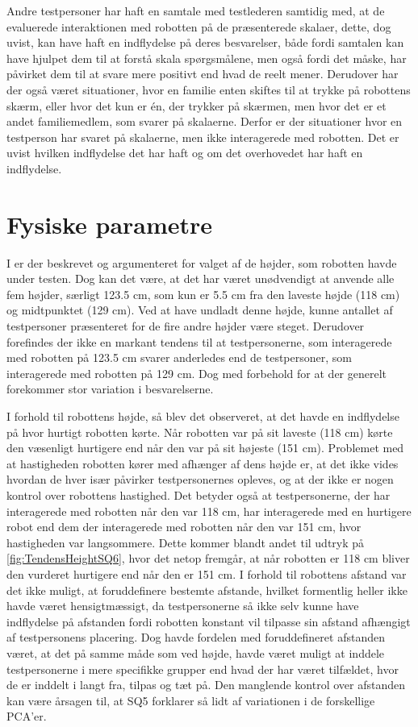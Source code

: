 Andre testpersoner har haft en samtale med testlederen samtidig med, at de evaluerede interaktionen med robotten på de præsenterede skalaer, dette, dog uvist, kan have haft en indflydelse på deres besvarelser, både fordi samtalen kan have hjulpet dem til at forstå skala spørgsmålene, men også fordi det måske, har påvirket dem til at svare mere positivt end hvad de reelt mener. Derudover har der også været situationer, hvor en familie enten skiftes til at trykke på robottens skærm, eller hvor det kun er én, der trykker på skærmen, men hvor det er et andet familiemedlem, som svarer på skalaerne. Derfor er der situationer hvor en testperson har svaret på skalaerne, men ikke interagerede med robotten. Det er uvist hvilken indflydelse det har haft og om det overhovedet har haft en indflydelse.  


\section{Fysiske parametre}
\label{DiskussionFysiskeParametre}
%
I  er der beskrevet og argumenteret for valget af de højder, som robotten havde under testen. Dog kan det være, at det har været unødvendigt at anvende alle fem højder, særligt 123.5 cm, som kun er 5.5 cm fra den laveste højde (118 cm) og midtpunktet (129 cm). Ved at have undladt denne højde, kunne antallet af testpersoner præsenteret for de fire andre højder være steget. Derudover forefindes der ikke en markant tendens til at testpersonerne, som interagerede med robotten på 123.5 cm svarer anderledes end de testpersoner, som interagerede med robotten på 129 cm. Dog med forbehold for at der generelt forekommer stor variation i besvarelserne. 

I forhold til robottens højde, så blev det observeret, at det havde en indflydelse på hvor hurtigt robotten kørte. Når robotten var på sit laveste (118 cm) kørte den væsenligt hurtigere end når den var på sit højeste (151 cm). Problemet med at hastigheden robotten kører med afhænger af dens højde er, at det ikke vides hvordan de hver især påvirker testpersonernes opleves, og at der ikke er nogen kontrol over robottens hastighed. Det betyder også at testpersonerne, der har interagerede med robotten når den var 118 cm, har interagerede med en hurtigere robot end dem der interagerede med robotten når den var 151 cm, hvor hastigheden var langsommere. Dette kommer blandt andet til udtryk på \autoref{fig:TendensHeightSQ6}, hvor det netop fremgår, at når robotten er 118 cm bliver den vurderet hurtigere end når den er 151 cm. \blankline
%
I forhold til robottens afstand var det ikke muligt, at foruddefinere bestemte afstande, hvilket formentlig heller ikke havde været hensigtmæssigt, da testpersonerne så ikke selv kunne have indflydelse på afstanden fordi robotten konstant vil tilpasse sin afstand afhængigt af testpersonens placering. Dog havde fordelen med foruddefineret afstanden været, at det på samme måde som ved højde, havde været muligt at inddele testpersonerne i mere specifikke grupper end hvad der har været tilfældet, hvor de er inddelt i langt fra, tilpas og tæt på. Den manglende kontrol over afstanden kan være årsagen til, at SQ5 forklarer så lidt af variationen i de forskellige PCA'er.

